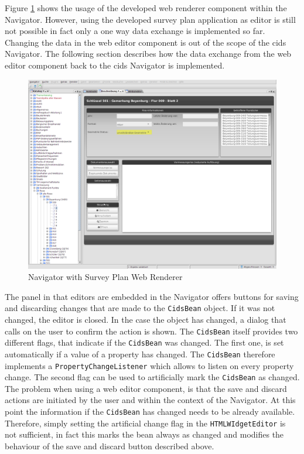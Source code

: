 Figure \ref{fig:nav_web_renderer} shows the usage of the developed web renderer component within the Navigator.
However, using the developed survey plan application as editor is still not possible in fact only a one way data exchange is implemented so far. 
Changing the data in the web editor component is out of the scope of the cids Navigator. 
The following section describes how the data exchange from the web editor component back to the cids Navigator is implemented.

\begin{figure}
	\centering	\includegraphics[width=1.0\textwidth]{./img/impl/navigator_web_renderer.png}
	\caption{Navigator with Survey Plan Web Renderer}
	\label{fig:nav_web_renderer}
\end{figure}

The panel in that editors are embedded in the Navigator offers buttons for saving and discarding changes that are made to the \texttt{CidsBean} object.
If it was not changed, the editor is closed.
In the case the object has changed, a dialog that calls on the user to confirm the action is shown.
The \texttt{CidsBean} itself provides two different flags, that indicate if the \texttt{CidsBean} was changed.
The first one, is set automatically if a value of a property has changed.
The \texttt{CidsBean} therefore implements a \texttt{PropertyChangeListener} which allows to listen on every property change.
The second flag can be used to artificially mark the \texttt{CidsBean} as changed.
The problem when using a web editor component, is that the save and discard actions are initiated by the user and within the context of the Navigator.
At this point the information if the \texttt{CidsBean} has changed needs to be already available.
Therefore, simply setting the artificial change flag in the \texttt{HTMLWIdgetEditor} is not sufficient, in fact this marks the bean always as changed and modifies the behaviour of the save and discard button described above.
 
